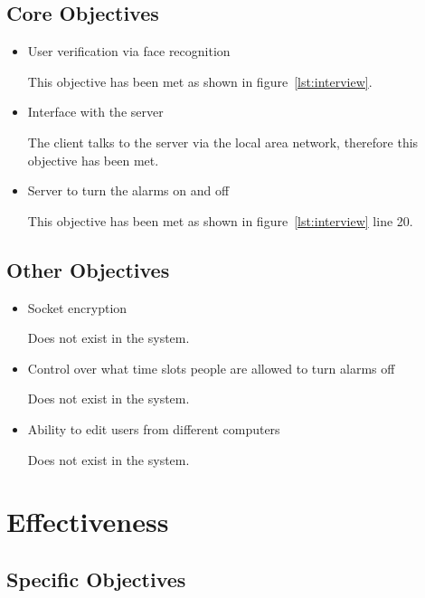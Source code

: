 \documentclass[12pt,a4paper]{report}
\begin{document}
	\subsection{Core Objectives}
		
		\begin{itemize}
			\item User verification via face recognition

				This objective has been met as shown in figure~\ref{lst:interview}.

			\item Interface with the server

				The client talks to the server via the local area network, therefore this objective has been met.

			\item Server to turn the alarms on and off

				This objective has been met as shown in figure~\ref{lst:interview} line 20.
		\end{itemize}

	\subsection{Other Objectives}
		
		\begin{itemize}
			\item Socket encryption

				Does not exist in the system.

			\item Control over what time slots people are allowed to turn alarms off

				Does not exist in the system.

			\item Ability to edit users from different computers

				Does not exist in the system.
		\end{itemize}




\section{Effectiveness}

	\subsection{Specific Objectives}
\end{document}
